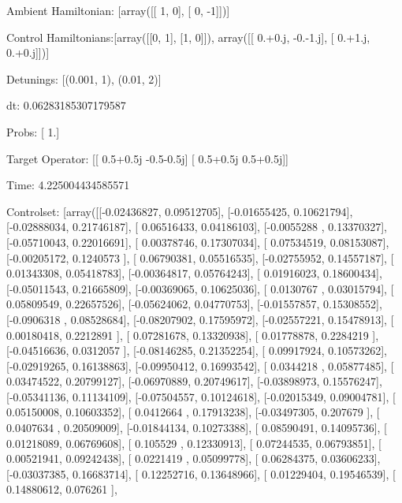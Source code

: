 \documentclass{article}
\begin{document}
    

\newpage

Ambient Hamiltonian: [array([[ 1,  0],
       [ 0, -1]])]

Control Hamiltonians:[array([[0, 1],
       [1, 0]]), array([[ 0.+0.j, -0.-1.j],
       [ 0.+1.j,  0.+0.j]])]

Detunings: [(0.001, 1), (0.01, 2)]

 dt: 0.06283185307179587

Probs: [ 1.]

Target Operator: [[ 0.5+0.5j -0.5-0.5j]
 [ 0.5+0.5j  0.5+0.5j]]

Time: 4.225004434585571

Controlset: [array([[-0.02436827,  0.09512705],
       [-0.01655425,  0.10621794],
       [-0.02888034,  0.21746187],
       [ 0.06516433,  0.04186103],
       [-0.0055288 ,  0.13370327],
       [-0.05710043,  0.22016691],
       [ 0.00378746,  0.17307034],
       [ 0.07534519,  0.08153087],
       [-0.00205172,  0.1240573 ],
       [ 0.06790381,  0.05516535],
       [-0.02755952,  0.14557187],
       [ 0.01343308,  0.05418783],
       [-0.00364817,  0.05764243],
       [ 0.01916023,  0.18600434],
       [-0.05011543,  0.21665809],
       [-0.00369065,  0.10625036],
       [ 0.0130767 ,  0.03015794],
       [ 0.05809549,  0.22657526],
       [-0.05624062,  0.04770753],
       [-0.01557857,  0.15308552],
       [-0.0906318 ,  0.08528684],
       [-0.08207902,  0.17595972],
       [-0.02557221,  0.15478913],
       [ 0.00180418,  0.2212891 ],
       [ 0.07281678,  0.13320938],
       [ 0.01778878,  0.2284219 ],
       [-0.04516636,  0.0312057 ],
       [-0.08146285,  0.21352254],
       [ 0.09917924,  0.10573262],
       [-0.02919265,  0.16138863],
       [-0.09950412,  0.16993542],
       [ 0.0344218 ,  0.05877485],
       [ 0.03474522,  0.20799127],
       [-0.06970889,  0.20749617],
       [-0.03898973,  0.15576247],
       [-0.05341136,  0.11134109],
       [-0.07504557,  0.10124618],
       [-0.02015349,  0.09004781],
       [ 0.05150008,  0.10603352],
       [ 0.0412664 ,  0.17913238],
       [-0.03497305,  0.207679  ],
       [ 0.0407634 ,  0.20509009],
       [-0.01844134,  0.10273388],
       [ 0.08590491,  0.14095736],
       [ 0.01218089,  0.06769608],
       [ 0.105529  ,  0.12330913],
       [ 0.07244535,  0.06793851],
       [ 0.00521941,  0.09242438],
       [ 0.0221419 ,  0.05099778],
       [ 0.06284375,  0.03606233],
       [-0.03037385,  0.16683714],
       [ 0.12252716,  0.13648966],
       [ 0.01229404,  0.19546539],
       [ 0.14880612,  0.076261  ],
\end{document}
